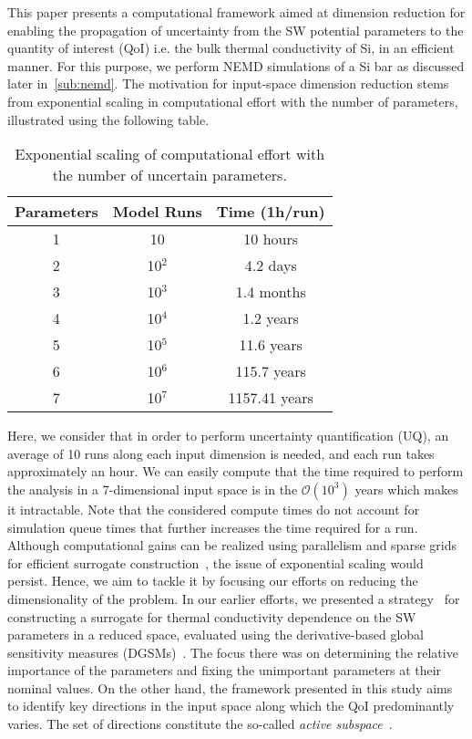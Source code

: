 This paper presents a computational framework aimed at dimension reduction
for enabling the propagation of uncertainty from the SW potential parameters to the
quantity of interest (QoI) i.e. the bulk thermal conductivity of Si,
in an efficient manner. For this purpose, we perform NEMD simulations of a Si bar
as discussed later in~\ref{sub:nemd}. The
motivation for input-space dimension reduction stems from exponential scaling in
computational effort with the number of parameters, illustrated using the following
table. 
%
\newcommand{\ra}[1]{\renewcommand{\arraystretch}{#1}}
\begin{table}[htbp]
\centering
\ra{1.3}
\begin{tabular}{@{}ccc@{}}\toprule
Parameters & Model Runs & Time (1h/run)\\
\bottomrule
1 & 10 & 10 hours \\
2 & 10$^2$ & 4.2 days \\
3 & 10$^3$ & 1.4 months \\
4 & 10$^4$ & 1.2 years \\
5 & 10$^5$ & 11.6 years \\
6 & 10$^6$ & 115.7 years \\
7 & 10$^7$ & 1157.41 years \\
\bottomrule
\end{tabular}
\caption{Exponential scaling of computational effort with the number of uncertain parameters.}
\label{tab:effort}
\end{table}
%
Here, we consider that in order to perform uncertainty quantification (UQ),
an average of 10 runs along each input dimension
is needed, and each run takes approximately an hour. We can easily compute that the time required to 
perform the analysis in a 7-dimensional input space is in the $\mathcal{O}(10^3)$ years which makes it
intractable. Note that the considered compute times do not account for simulation queue times that further 
increases the time required for a run. 
Although computational gains can be realized using parallelism and sparse grids
for efficient surrogate construction~\cite{Ma:2009,Constantine:2012,Petvipusit:2014,Vohra:2014}, 
the issue of exponential scaling would persist.  
Hence, we aim to tackle it by focusing our efforts on reducing the dimensionality of the problem.
In our earlier efforts, we presented a strategy~\cite{Vohra:2018b}
for constructing a surrogate for thermal conductivity dependence on the SW parameters
in a reduced space, evaluated using the derivative-based global sensitivity measures
(DGSMs)~\cite{Vohra:2018a}. The focus there was on determining the relative importance of the
parameters and fixing the unimportant parameters at their nominal values. On the other hand, the
framework presented in this study aims to identify key directions in the input space along which the
QoI predominantly varies. The set of directions constitute the so-called 
\textit{active subspace}~\cite{Constantine:2015}.  

